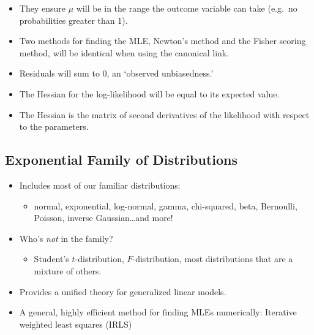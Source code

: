 \documentclass[
  openany]{book}
\providecommand{\tightlist}{%
  \setlength{\itemsep}{0pt}\setlength{\parskip}{0pt}}
\begin{document}
\begin{itemize}
\tightlist
\item
  They ensure \(\mu\) will be in the range the outcome variable can take (e.g.~no probabilities greater than 1).\\
\item
  Two methods for finding the MLE, Newton's method and the Fisher scoring method, will be identical when using the canonical link.\\
\item
  Residuals will sum to 0, an `observed unbiasedness.'\\
\item
  The Hessian for the log-likelihood will be equal to its expected value.\\
\item
  The Hessian is the matrix of second derivatives of the likelihood with respect to the parameters.
\end{itemize}

\hypertarget{exponential-family-of-distributions}{%
\subsection{Exponential Family of Distributions}\label{exponential-family-of-distributions}}

\begin{itemize}
\item
  Includes most of our familiar distributions:

  \begin{itemize}
  \tightlist
  \item
    normal, exponential, log-normal, gamma, chi-squared, beta,
    Bernoulli, Poisson, inverse Gaussian\ldots and more!
  \end{itemize}
\item
  Who's \emph{not} in the family?

  \begin{itemize}
  \tightlist
  \item
    Student's \(t\)-distribution, \(F\)-distribution, most distributions
    that are a mixture of others.
  \end{itemize}
\item
  Provides a unified theory for generalized linear models.
\item
  A general, highly efficient method for finding MLEs numerically:
  Iterative weighted least squares (IRLS)
\end{itemize}
\end{document}

